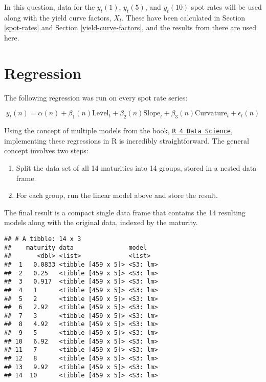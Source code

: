 \documentclass[openany]{book}
\providecommand{\tightlist}{%
  \setlength{\itemsep}{0pt}\setlength{\parskip}{0pt}}
\theoremstyle{definition}
\theoremstyle{definition}
\theoremstyle{definition}
\theoremstyle{remark}
\begin{document}
\small

\normalsize

In this question, data for the \(y_t(1)\), \(y_t(5)\), and \(y_t(10)\)
spot rates will be used along with the yield curve factors, \(X_t\).
These have been calculated in Section \ref{spot-rates} and Section
\ref{yield-curve-factors}, and the results from there are used here.

\small

\normalsize

\hypertarget{regression}{%
\section{Regression}\label{regression}}

The following regression was run on every spot rate series:

\[ y_{t}(n) = \alpha(n) + \beta_1(n) \text{Level}_t + \beta_2(n) \text{Slope}_t + \beta_3(n) \text{Curvature}_t + \epsilon_t(n) \]

Using the concept of multiple models from the book,
\href{http://r4ds.had.co.nz/many-models.html}{\texttt{R\ 4\ Data\ Science}},
implementing these regressions in R is incredibly straightforward. The
general concept involves two steps:

\begin{enumerate}
\def\labelenumi{\arabic{enumi})}
\tightlist
\item
  Split the data set of all 14 maturities into 14 groups, stored in a
  nested data frame.
\item
  For each group, run the linear model above and store the result.
\end{enumerate}

\small

\normalsize

\small

\normalsize

The final result is a compact single data frame that contains the 14
resulting models along with the original data, indexed by the maturity.

\small

\begin{verbatim}
## # A tibble: 14 x 3
##    maturity data               model   
##       <dbl> <list>             <list>  
##  1   0.0833 <tibble [459 x 5]> <S3: lm>
##  2   0.25   <tibble [459 x 5]> <S3: lm>
##  3   0.917  <tibble [459 x 5]> <S3: lm>
##  4   1      <tibble [459 x 5]> <S3: lm>
##  5   2      <tibble [459 x 5]> <S3: lm>
##  6   2.92   <tibble [459 x 5]> <S3: lm>
##  7   3      <tibble [459 x 5]> <S3: lm>
##  8   4.92   <tibble [459 x 5]> <S3: lm>
##  9   5      <tibble [459 x 5]> <S3: lm>
## 10   6.92   <tibble [459 x 5]> <S3: lm>
## 11   7      <tibble [459 x 5]> <S3: lm>
## 12   8      <tibble [459 x 5]> <S3: lm>
## 13   9.92   <tibble [459 x 5]> <S3: lm>
## 14  10      <tibble [459 x 5]> <S3: lm>
\end{verbatim}
\end{document}

